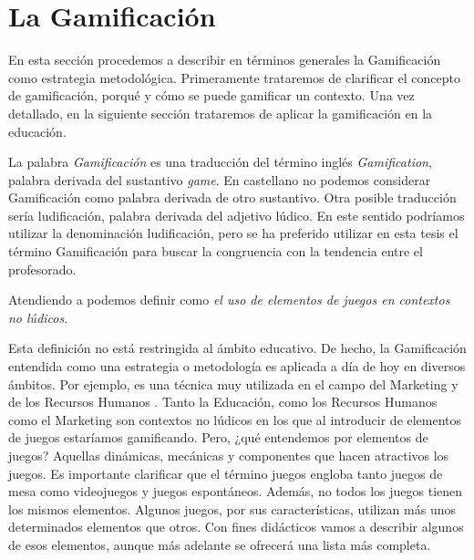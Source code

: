 
\section{La Gamificación}




En esta sección procedemos a describir en términos generales la Gamificación como estrategia metodológica.
%
Primeramente trataremos de clarificar el concepto de gamificación, porqué y cómo se puede gamificar un contexto.
%
Una vez detallado, en la siguiente sección trataremos de aplicar la gamificación en la educación.


La palabra \textit{Gamificación} es una traducción del término inglés \textit{Gamification}, palabra derivada del sustantivo \textit{game}.
%
En castellano no podemos considerar Gamificación como palabra derivada de otro sustantivo. 
%
Otra posible traducción sería ludificación, palabra derivada del adjetivo lúdico.
%
En este sentido podríamos utilizar la denominación ludificación, pero se ha preferido utilizar en esta tesis el término Gamificación para buscar la congruencia con la tendencia entre el profesorado.




Atendiendo a \cite{GamificationDef} podemos definir  como \textit{el uso de elementos de juegos en contextos no lúdicos}. 

Esta definición no está restringida al ámbito educativo. 
%
De hecho, la Gamificación entendida como una estrategia o metodología es aplicada a día de hoy en diversos ámbitos. 
%
Por ejemplo, es una técnica muy utilizada en el campo del Marketing \cite{GamifyMark} y de los Recursos Humanos \cite{GamifyHR}.
%
Tanto la Educación, como los Recursos Humanos como el Marketing son contextos no lúdicos en los que al introducir de elementos de juegos estaríamos gamificando. 
%
Pero, ¿qué entendemos por elementos de juegos? 
%
Aquellas dinámicas, mecánicas y componentes que hacen atractivos los juegos.
%
Es importante clarificar que el término juegos engloba tanto juegos de mesa como videojuegos y juegos espontáneos.
%
Además, no todos los juegos tienen los mismos elementos.
%
Algunos juegos, por sus características, utilizan más unos determinados elementos que otros.
%
Con fines didácticos vamos a describir algunos de esos elementos, aunque más adelante se ofrecerá una lista más completa.

